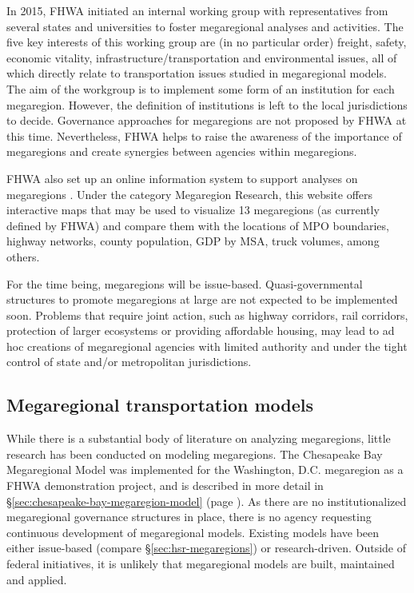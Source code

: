 In 2015, FHWA initiated an internal working group with representatives from several states and universities to foster megaregional analyses and activities. The five key interests of this working group are (in no particular order) freight, safety, economic vitality, infrastructure/transportation and environmental issues, all of which directly relate to transportation issues studied in megaregional models. The aim of the workgroup is to implement some form of an institution for each megaregion. However, the definition of institutions is left to the local jurisdictions to decide. Governance approaches for megaregions are not proposed by FHWA at this time. Nevertheless, FHWA helps to raise the awareness of the importance of megaregions and create synergies between agencies within megaregions.

FHWA also set up an online information system to support analyses on megaregions \citep{fhwa16a}. Under the category Megaregion Research, this website offers interactive maps that may be used to visualize 13 megaregions (as currently defined by FHWA) and compare them with the locations of MPO boundaries, highway networks, county population, GDP by MSA, truck volumes, among others.

For the time being, megaregions will be issue-based. Quasi-governmental structures to promote megaregions at large are not expected to be implemented soon. Problems that require joint action, such as highway corridors, rail corridors, protection of larger ecosystems or providing affordable housing, may lead to ad hoc creations of megaregional agencies with limited authority and under the tight control of state and/or metropolitan jurisdictions.

\subsection{Megaregional transportation models}\label{sec:megaregion-transport-models}

While there is a substantial body of literature on analyzing megaregions, little research has been conducted on modeling megaregions. The Chesapeake Bay Megaregional Model was implemented for the Washington, D.C. megaregion \citep{moeckel15b} as a FHWA demonstration project, and is described in more detail in \S\ref{sec:chesapeake-bay-megaregion-model} (page \pageref{sec:chesapeake-bay-megaregion-model}). As there are no institutionalized megaregional governance structures in place, there is no agency requesting continuous development of megaregional models. Existing models have been either issue-based (compare \S\ref{sec:hsr-megaregions}) or research-driven. Outside of federal initiatives, it is unlikely that megaregional models are built, maintained and applied.

